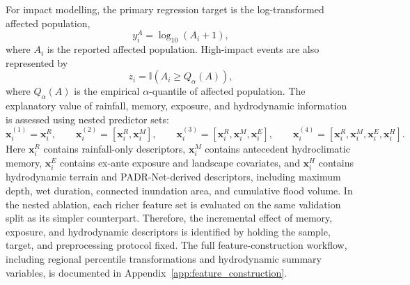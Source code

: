 \documentclass[pdflatex,sn-mathphys-ay]{sn-jnl}
\theoremstyle{thmstyleone}
\begin{document}
For impact modelling, the primary regression target is the
log-transformed affected population,
\begin{equation}
  y^{A}_{i}
  =
  \log_{10}(A_i+1),
  \label{eq:impact_target}
\end{equation}
where $A_i$ is the reported affected population.  High-impact events
are also represented by
\begin{equation}
  z_i
  =
  \mathbb{I}
  \left(
    A_i\geq Q_{\alpha}(A)
  \right),
  \label{eq:impact_indicator}
\end{equation}
where $Q_{\alpha}(A)$ is the empirical $\alpha$-quantile of affected
population.  The explanatory value of rainfall, memory, exposure, and
hydrodynamic information is assessed using nested predictor sets:
\begin{equation}
  \mathbf{x}^{(1)}_{i}=\mathbf{x}^{R}_{i},
  \qquad
  \mathbf{x}^{(2)}_{i}=
  [\mathbf{x}^{R}_{i},\mathbf{x}^{M}_{i}],
  \qquad
  \mathbf{x}^{(3)}_{i}=
  [\mathbf{x}^{R}_{i},\mathbf{x}^{M}_{i},\mathbf{x}^{E}_{i}],
  \qquad
  \mathbf{x}^{(4)}_{i}=
  [\mathbf{x}^{R}_{i},\mathbf{x}^{M}_{i},\mathbf{x}^{E}_{i},\mathbf{x}^{H}_{i}].
  \label{eq:nested_features}
\end{equation}
Here $\mathbf{x}^{R}_{i}$ contains rainfall-only descriptors,
$\mathbf{x}^{M}_{i}$ contains antecedent hydroclimatic memory,
$\mathbf{x}^{E}_{i}$ contains ex-ante exposure and landscape
covariates, and $\mathbf{x}^{H}_{i}$ contains hydrodynamic terrain and
PADR-Net-derived descriptors, including maximum depth, wet duration,
connected inundation area, and cumulative flood volume.  In the
nested ablation, each richer feature set is evaluated on the same
validation split as its simpler counterpart.  Therefore, the
incremental effect of memory, exposure, and hydrodynamic descriptors is
identified by holding the sample, target, and preprocessing protocol
fixed.  The full feature-construction workflow, including regional
percentile transformations and hydrodynamic summary variables, is
documented in Appendix~\ref{app:feature_construction}.
\end{document}
